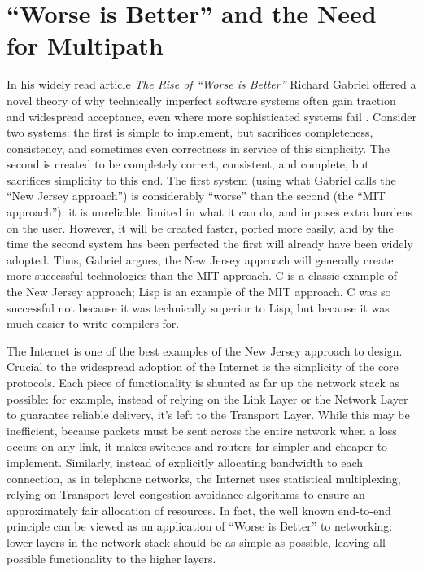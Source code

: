 \section{``Worse is Better'' and the Need for Multipath}
\label{sec:multi}

In his widely read article \emph{The Rise of ``Worse is Better''} Richard Gabriel offered a novel theory of why technically imperfect software systems often gain traction and widespread acceptance, even where more sophisticated systems fail \cite{worseisbetter}. Consider two systems: the first is simple to implement, but sacrifices completeness, consistency, and sometimes even correctness in service of this simplicity. The second is created to be completely correct, consistent, and complete, but sacrifices simplicity to this end. The first system (using what Gabriel calls the ``New Jersey approach'') is considerably ``worse'' than the second (the ``MIT approach''): it is unreliable, limited in what it can do, and imposes extra burdens on the user. However, it will be created faster, ported more easily, and by the time the second system has been perfected the first will already have been widely adopted. Thus, Gabriel argues, the New Jersey approach will generally create more successful technologies than the MIT approach. C is a classic example of the New Jersey approach; Lisp is an example of the MIT approach. C was so successful not because it was technically superior to Lisp, but because it was much easier to write compilers for. 

The Internet is one of the best examples of the New Jersey approach to design. Crucial to the widespread adoption of the Internet is the simplicity of the core protocols. Each piece of functionality is shunted as far up the network stack as possible: for example, instead of relying on the Link Layer or the Network Layer to guarantee reliable delivery, it's left to the Transport Layer. While this may be inefficient, because packets must be sent across the entire network when a loss occurs on any link, it makes switches and routers far simpler and cheaper to implement. Similarly, instead of explicitly allocating bandwidth to each connection, as in telephone networks, the Internet uses statistical multiplexing, relying on Transport level congestion avoidance algorithms to ensure an approximately fair allocation of resources. In fact, the well known end-to-end principle\cite{saltzer1984end} can be viewed as an application of ``Worse is Better'' to networking: lower layers in the network stack should be as simple as possible, leaving all possible functionality to the higher layers.

